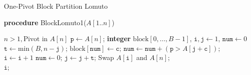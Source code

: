 \documentclass{article}
\newcommand\lomutoone{\textsf{BlockLomuto1}}
\begin{document}
\begin{algorithm}[t!]
    \small
    \caption{One-Pivot Block Partition Lomuto}\samepage\label{algo:single:pivot:partitioning}
    \textbf{procedure} \lomutoone($\textit{A}[1..\textit{n}]$)
    \begin{algorithmic}[1]
        \Require $\textit{n} > 1, \text{Pivot in $\textit{A}[\textit{n}]$}$
        \State $\texttt{p} \gets \textit{A}[\textit{n}]$; 
    \State \textbf{integer} $\text{block}[0, \ldots, \textit{B} - 1]$, $\texttt{i}, \texttt{j} \gets 1$, $\texttt{num} \gets 0$
    \State $\texttt{t} \gets \text{min}(\textit{B}, \textit{n} - \texttt{j} )$;
                \State $\text{block}[\texttt{num}] \gets \texttt{c}$;
            \State $\texttt{num} \gets \texttt{num} +  (\texttt{p} > \textit{A}[\texttt{j} + \texttt{c}])$;
            \EndFor
        \State {}
        \State $\texttt{i} \gets \texttt{i} + 1$
            \EndFor
            \State $\texttt{num} \gets 0$;
        \State $\texttt{j} \gets \texttt{j} + \texttt{t}$;
        \EndWhile
        \State Swap $\textit{A}[\texttt{i}]$ and $\textit{A}[\textit{n}]$;\\
    \Return $\texttt{i}$;
    \end{algorithmic}
\end{algorithm}
\end{document}
